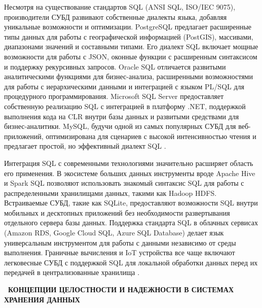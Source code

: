 \documentclass{SibFU-docs}
\begin{document}

Несмотря на существование стандартов SQL (ANSI SQL, ISO/IEC 9075), производители СУБД развивают собственные диалекты языка, добавляя уникальные возможности и оптимизации. PostgreSQL предлагает расширенные типы данных для работы с географической информацией (PostGIS), массивами, диапазонами значений и составными типами. Его диалект SQL включает мощные возможности для работы с JSON, оконные функции с расширенным синтаксисом и поддержку рекурсивных запросов. Oracle SQL отличается развитыми аналитическими функциями для бизнес-анализа, расширенными возможностями для работы с иерархическими данными и интеграцией с языком PL/SQL для процедурного программирования. Microsoft SQL Server предоставляет собственную реализацию SQL с интеграцией в платформу .NET, поддержкой выполнения кода на CLR внутри базы данных и развитыми средствами для бизнес-аналитики. MySQL, будучи одной из самых популярных СУБД для веб-приложений, оптимизирована для сценариев с высокой интенсивностью чтения и предлагает простой, но эффективный диалект SQL \cite{postgresqldocs}.

Интеграция SQL с современными технологиями значительно расширяет область его применения. В экосистеме больших данных инструменты вроде Apache Hive и Spark SQL позволяют использовать знакомый синтаксис SQL для работы с распределенными хранилищами данных, такими как Hadoop HDFS. Встраиваемые СУБД, такие как SQLite, предоставляют возможности SQL внутри мобильных и десктопных приложений без необходимости развертывания отдельного сервера базы данных. Поддержка стандарта SQL в облачных сервисах (Amazon RDS, Google Cloud SQL, Azure SQL Database) делает язык универсальным инструментом для работы с данными независимо от среды выполнения. Граничные вычисления и IoT устройства все чаще включают легковесные СУБД с поддержкой SQL для локальной обработки данных перед их передачей в централизованные хранилища \cite{tpc}.

\newpage
{}
\begin{center}\textbf{\thesection\ КОНЦЕПЦИИ ЦЕЛОСТНОСТИ И НАДЕЖНОСТИ В СИСТЕМАХ ХРАНЕНИЯ ДАННЫХ}\end{center}
\vspace*{-1.5em}

\end{document}
